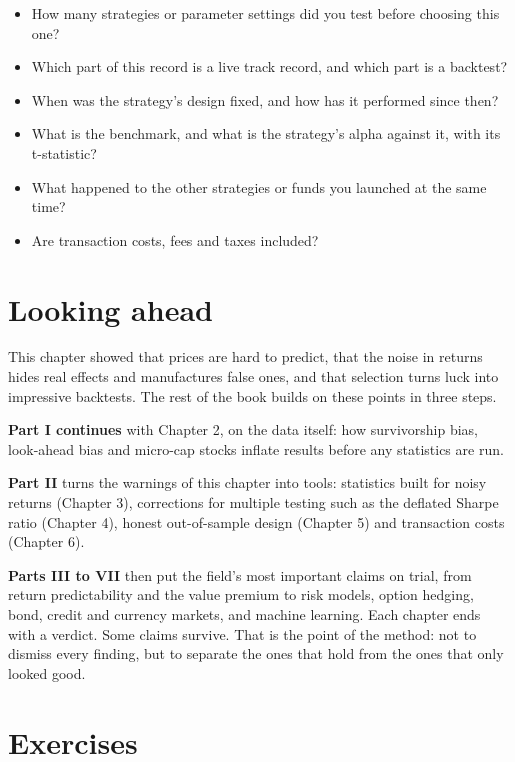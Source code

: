 \begin{itemize}
  \item How many strategies or parameter settings did you test before choosing this one?
  \item Which part of this record is a live track record, and which part is a backtest?
  \item When was the strategy's design fixed, and how has it performed since then?
  \item What is the benchmark, and what is the strategy's alpha against it, with its t-statistic?
  \item What happened to the other strategies or funds you launched at the same time?
  \item Are transaction costs, fees and taxes included?
\end{itemize}

\section{Looking ahead}
\label{sec:01-ahead}

This chapter showed that prices are hard to predict, that the noise in returns hides real effects and manufactures false ones, and that selection turns luck into impressive backtests. The rest of the book builds on these points in three steps.

\textbf{Part I continues} with Chapter 2, on the data itself: how survivorship bias, look-ahead bias and micro-cap stocks inflate results before any statistics are run.

\textbf{Part II} turns the warnings of this chapter into tools: statistics built for noisy returns (Chapter 3), corrections for multiple testing such as the deflated Sharpe ratio (Chapter 4), honest out-of-sample design (Chapter 5) and transaction costs (Chapter 6).

\textbf{Parts III to VII} then put the field's most important claims on trial, from return predictability and the value premium to risk models, option hedging, bond, credit and currency markets, and machine learning. Each chapter ends with a verdict. Some claims survive. That is the point of the method: not to dismiss every finding, but to separate the ones that hold from the ones that only looked good.

\section*{Exercises}

